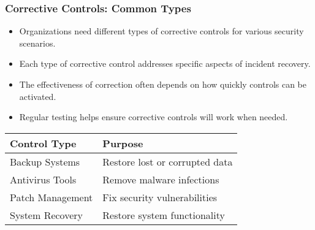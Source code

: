 \documentclass{beamer}
\begin{document}
\begin{frame}
    \frametitle{Corrective Controls: Common Types}
    
    \begin{itemize}
        \item Organizations need different types of corrective controls for various security scenarios.
        
        \item Each type of corrective control addresses specific aspects of incident recovery.
        
        \item The effectiveness of correction often depends on how quickly controls can be activated.
        
        \item Regular testing helps ensure corrective controls will work when needed.
    \end{itemize}
    
    \begin{table}
        \begin{tabular}{|l|l|}
            \hline
            \textbf{Control Type} & \textbf{Purpose} \\
            \hline
            Backup Systems & Restore lost or corrupted data \\
            Antivirus Tools & Remove malware infections \\
            Patch Management & Fix security vulnerabilities \\
            System Recovery & Restore system functionality \\
            \hline
        \end{tabular}
    \end{table}
\end{frame}
\end{document}
